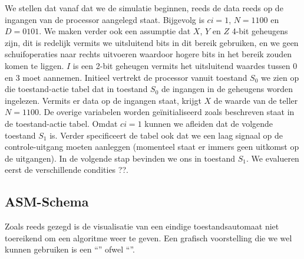 We stellen dat vanaf dat we de simulatie beginnen, reeds de data reeds op de ingangen van de processor aangelegd staat. Bijgevolg is $ci=1$, $N=1100$ en $D=0101$. We maken verder ook een assumptie dat $X$, $Y$ en $Z$ 4-bit geheugens zijn, dit is redelijk vermits we uitsluitend bits in dit bereik gebruiken, en we geen schuifoperaties naar rechts uitvoeren waardoor hogere bits in het bereik zouden komen te liggen. $I$ is een 2-bit geheugen vermits het uitsluitend waardes tussen 0 en 3 moet aannemen. Initieel vertrekt de processor vanuit toestand $S_0$ we zien op die toestand-actie tabel dat in toestand $S_0$ de ingangen in de geheugens worden ingelezen. Vermits er data op de ingangen staat, krijgt $X$ de waarde van de teller $N=1100$. De overige variabelen worden ge\"initialiseerd zoals beschreven staat in de toestand-actie tabel. Omdat $ci=1$ kunnen we afleiden dat de volgende toestand $S_1$ is. Verder specificeert de tabel ook dat we een laag signaal op de controle-uitgang moeten aanleggen (momenteel staat er immers geen uitkomst op de uitgangen). In de volgende stap bevinden we ons in toestand $S_1$. We evalueren eerst de verschillende condities ??.
\subsection{ASM-Schema}
Zoals reeds gezegd is de visualisatie van een eindige toestandsautomaat niet toereikend om een algoritme weer te geven. Een grafisch voorstelling die we wel kunnen gebruiken is een ``'' ofwel ``''.
